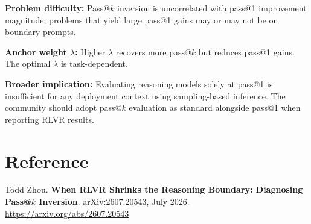 \documentclass[10pt,twocolumn]{article}
\begin{document}
\textbf{Problem difficulty:} Pass@$k$ inversion is uncorrelated with
pass@1 improvement magnitude; problems that yield large pass@1 gains
may or may not be on boundary prompts.

\textbf{Anchor weight $\lambda$:} Higher $\lambda$ recovers more
pass@$k$ but reduces pass@1 gains. The optimal $\lambda$ is
task-dependent.

\textbf{Broader implication:} Evaluating reasoning models solely at
pass@1 is insufficient for any deployment context using sampling-based
inference. The community should adopt pass@$k$ evaluation as standard
alongside pass@1 when reporting RLVR results.

\section*{Reference}

Todd Zhou.
\textbf{When RLVR Shrinks the Reasoning Boundary: Diagnosing
Pass@$k$ Inversion}.
arXiv:2607.20543, July 2026.
\url{https://arxiv.org/abs/2607.20543}
\end{document}
